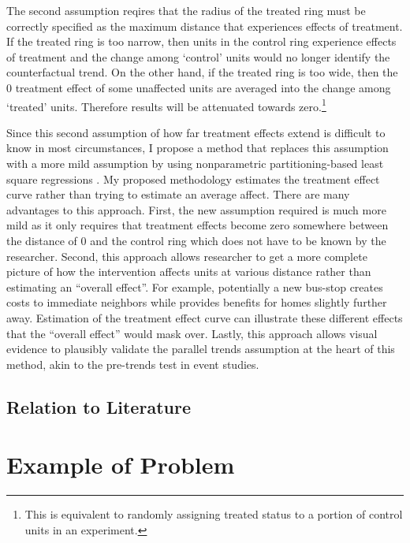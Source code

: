 \documentclass[10pt]{article}
\begin{document}
The second assumption reqires that the radius of the treated ring must be correctly specified as the maximum distance that experiences effects of treatment. If the treated ring is too narrow, then units in the control ring experience effects of treatment and the change among `control' units would no longer identify the counterfactual trend. On the other hand, if the treated ring is too wide, then the 0 treatment effect of some unaffected units are averaged into the change among `treated' units. Therefore results will be attenuated towards zero.\footnote{This is equivalent to randomly assigning treated status to a portion of control units in an experiment.}

Since this second assumption of how far treatment effects extend is difficult to know in most circumstances, I propose a method that replaces this assumption with a more mild assumption by using nonparametric partitioning-based least square regressions \citep{Cattaneo_Farrell_Feng_2019,Cattaneo_Crump_Farrell_Feng_2019}. My proposed methodology estimates the treatment effect curve rather than trying to estimate an average affect. There are many advantages to this approach. First, the new assumption required is much more mild as it only requires that treatment effects become zero somewhere between the distance of 0 and the control ring which does not have to be known by the researcher. Second, this approach allows researcher to get a more complete picture of how the intervention affects units at various distance rather than estimating an ``overall effect''. For example, potentially a new bus-stop creates costs to immediate neighbors while provides benefits for homes slightly further away. Estimation of the treatment effect curve can illustrate these different effects that the ``overall effect'' would mask over. Lastly, this approach allows visual evidence to plausibly validate the parallel trends assumption at the heart of this method, akin to the pre-trends test in event studies.

\subsection{Relation to Literature}




\section{Example of Problem}
\end{document}
